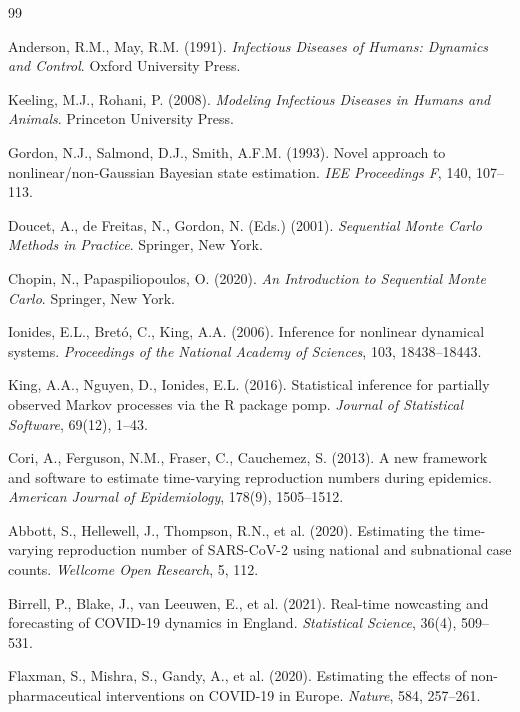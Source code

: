 \documentclass[11pt]{article}
\begin{document}
\begin{thebibliography}{99}

Anderson, R.M., May, R.M. (1991).
\emph{Infectious Diseases of Humans: Dynamics and Control}.
Oxford University Press.

Keeling, M.J., Rohani, P. (2008).
\emph{Modeling Infectious Diseases in Humans and Animals}.
Princeton University Press.

Gordon, N.J., Salmond, D.J., Smith, A.F.M. (1993).
Novel approach to nonlinear/non-Gaussian Bayesian state estimation.
\emph{IEE Proceedings F}, 140, 107--113.

Doucet, A., de Freitas, N., Gordon, N. (Eds.) (2001).
\emph{Sequential Monte Carlo Methods in Practice}. Springer, New York.

Chopin, N., Papaspiliopoulos, O. (2020).
\emph{An Introduction to Sequential Monte Carlo}. Springer, New York.

Ionides, E.L., Bret\'{o}, C., King, A.A. (2006).
Inference for nonlinear dynamical systems.
\emph{Proceedings of the National Academy of Sciences}, 103, 18438--18443.

King, A.A., Nguyen, D., Ionides, E.L. (2016).
Statistical inference for partially observed Markov processes via the
R package pomp.
\emph{Journal of Statistical Software}, 69(12), 1--43.

Cori, A., Ferguson, N.M., Fraser, C., Cauchemez, S. (2013).
A new framework and software to estimate time-varying reproduction
numbers during epidemics.
\emph{American Journal of Epidemiology}, 178(9), 1505--1512.

Abbott, S., Hellewell, J., Thompson, R.N., et al. (2020).
Estimating the time-varying reproduction number of SARS-CoV-2 using
national and subnational case counts.
\emph{Wellcome Open Research}, 5, 112.

Birrell, P., Blake, J., van Leeuwen, E., et al. (2021).
Real-time nowcasting and forecasting of COVID-19 dynamics in England.
\emph{Statistical Science}, 36(4), 509--531.

Flaxman, S., Mishra, S., Gandy, A., et al. (2020).
Estimating the effects of non-pharmaceutical interventions on
COVID-19 in Europe.
\emph{Nature}, 584, 257--261.


\end{thebibliography}
\end{document}

